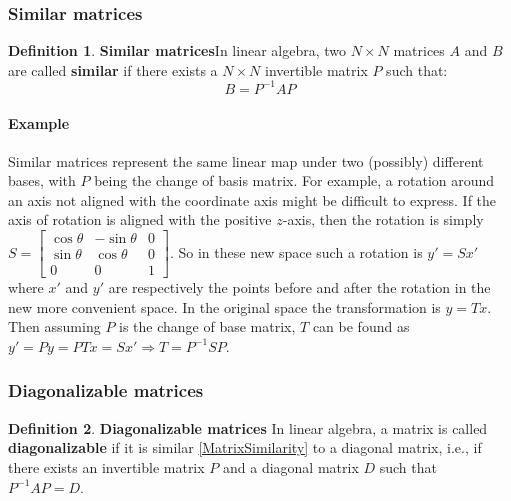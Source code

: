 \documentclass[12pt, letterpaper]{article}
\theoremstyle{definition}
\newtheorem{definition}{Definition}[section]
\let\tb\textbf
\begin{document}
\subsubsection{Similar matrices}
\label{MatrixSimilarity}
\begin{definition}{\tb{Similar matrices}}In linear algebra, two $N\times N$ matrices $A$ and $B$ are called \tb{similar} if there exists a $N\times N$ invertible matrix $P$ such that:
\begin{equation}
B = P^{-1}AP
\end{equation}	
\end{definition}

\paragraph{\tb{Example}} Similar matrices represent the same linear map under two (possibly) different bases, with $P$ being the change of basis matrix. For example, a rotation around an axis not aligned with the coordinate axis might be difficult to express.  If the axis of rotation is aligned with the positive $z$-axis, then the rotation is simply $S =\begin{bmatrix}\cos \theta &-\sin \theta &0\\\sin \theta &\cos \theta &0\\0&0&1\end{bmatrix}$. So in these new space such a rotation is $y' = Sx'$ where $x'$ and $y'$ are respectively the points before and after the rotation in the new more convenient space. 
In the original space the transformation is $y = Tx$. Then assuming $P$ is the change of base matrix, $T$ can be found as $y' = P y = PTx= S x' \Rightarrow T = P^{-1} S P$.

\subsubsection{Diagonalizable matrices}
\begin{definition}{\tb{Diagonalizable matrices}} In linear algebra, a matrix is called \tb{diagonalizable} if it is similar \autoref{MatrixSimilarity} to a diagonal matrix, i.e., if there exists an invertible matrix $P$ and a diagonal matrix $D$ such that $P^{-1}AP =D$.
\end{definition}
\end{document}
